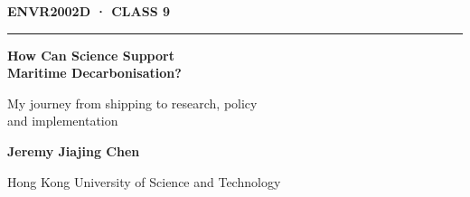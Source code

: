 \documentclass[aspectratio=169,11pt]{beamer}
\newcommand{\partlabel}[1]{%
  {\color{Navy}\fontsize{9}{11}\selectfont\bfseries\MakeUppercase{#1}\par}
}
\begin{document}
\begin{frame}[plain]
  \vspace{0.55cm}
  \partlabel{ENVR2002D · Class 9}
  \vspace{0.2cm}
  {\color{Navy}\rule{\textwidth}{0.8pt}\par}

  \vspace{0.75cm}
  {\color{Ink}\fontsize{29}{33}\selectfont\bfseries
    How Can Science Support\\
    Maritime Decarbonisation?
  \par}

  \vspace{0.5cm}
  {\color{Ink}\fontsize{15}{20}\selectfont
    My journey from shipping to research, policy\\
    and implementation
  \par}

  \vfill
  {\color{Ink}\fontsize{12}{15}\selectfont\bfseries Jeremy Jiajing Chen\par}
  \vspace{0.06cm}
  {\color{Muted}\fontsize{10}{12}\selectfont Hong Kong University of Science and Technology\par}
  \vspace{0.4cm}
\end{frame}
\end{document}

